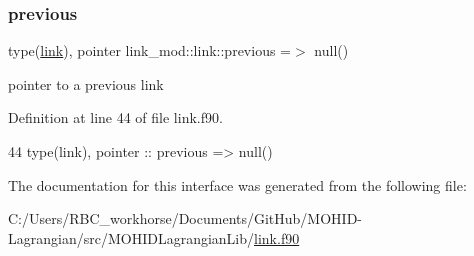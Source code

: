 \subsubsection{\texorpdfstring{previous}{previous}}
{\footnotesize\ttfamily type(\mbox{\hyperlink{structlink__mod_1_1link}{link}}), pointer link\+\_\+mod\+::link\+::previous =$>$ null()\hspace{0.3cm}{\ttfamily [private]}}



pointer to a previous link 



Definition at line 44 of file link.\+f90.


\begin{DoxyCode}
44         \textcolor{keywordtype}{type}(link), \textcolor{keywordtype}{pointer} :: previous => null() 
\end{DoxyCode}


The documentation for this interface was generated from the following file\+:\begin{DoxyCompactItemize}
\item 
C\+:/\+Users/\+R\+B\+C\+\_\+workhorse/\+Documents/\+Git\+Hub/\+M\+O\+H\+I\+D-\/\+Lagrangian/src/\+M\+O\+H\+I\+D\+Lagrangian\+Lib/\mbox{\hyperlink{link_8f90}{link.\+f90}}\end{DoxyCompactItemize}
